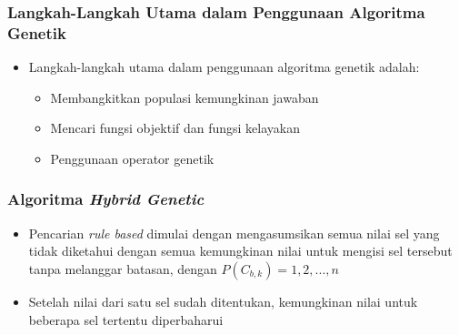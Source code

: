 \documentclass{beamer}
\begin{document}

\begin{frame}
\frametitle{Langkah-Langkah Utama dalam Penggunaan Algoritma Genetik}
\begin{itemize}
\item Langkah-langkah utama dalam penggunaan algoritma genetik adalah:
	\begin{itemize}
	\item Membangkitkan populasi kemungkinan jawaban
	\item Mencari fungsi objektif dan fungsi kelayakan
	\item Penggunaan operator genetik
	\end{itemize}
\end{itemize}
\end{frame}


\begin{frame}
\frametitle{Algoritma \textit{Hybrid Genetic}}
\begin{itemize}
\item Pencarian \textit{rule based} dimulai dengan mengasumsikan semua nilai sel yang tidak diketahui dengan semua kemungkinan nilai untuk mengisi sel tersebut tanpa melanggar batasan, dengan \begin{math}P(C_{b,k}) = {1, 2, ..., n}\end{math}
\item Setelah nilai dari satu sel sudah ditentukan, kemungkinan nilai untuk beberapa sel tertentu diperbaharui
\end{itemize}
\end{frame}
\end{document}
